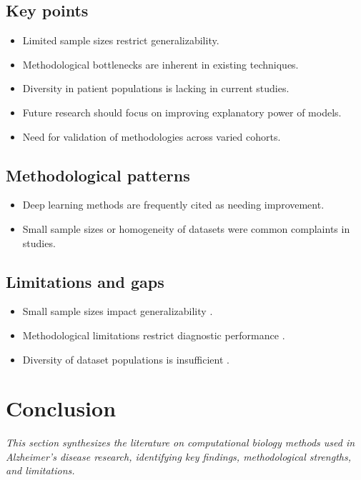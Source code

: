 \documentclass{MITcsail}
\begin{document}
\subsection*{Key points}
\begin{itemize}
  \item Limited sample sizes restrict generalizability.
  \item Methodological bottlenecks are inherent in existing techniques.
  \item Diversity in patient populations is lacking in current studies.
  \item Future research should focus on improving explanatory power of models.
  \item Need for validation of methodologies across varied cohorts.
\end{itemize}

\subsection*{Methodological patterns}
\begin{itemize}
  \item Deep learning methods are frequently cited as needing improvement.
  \item Small sample sizes or homogeneity of datasets were common complaints in studies.
\end{itemize}

\subsection*{Limitations and gaps}
\begin{itemize}
  \item Small sample sizes impact generalizability \citep{ref_10_1523_jneurosci_2250_06_2006,ref_10_1371_journal_pcbi_1000100}.
  \item Methodological limitations restrict diagnostic performance \citep{ref_10_1109_isbi_2014_6868045}.
  \item Diversity of dataset populations is insufficient \citep{ref_10_1148_radiol_2018180958,ref_10_1148_radiol_2016152703}.
\end{itemize}

\section{Conclusion}

\textit{This section synthesizes the literature on computational biology methods used in Alzheimer's disease research, identifying key findings, methodological strengths, and limitations.}
\end{document}
